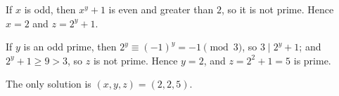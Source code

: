 If $x$ is odd, then $x^y+1$ is even and greater than $2$, so it is not prime. Hence $x=2$ and $z=2^y+1$.

If $y$ is an odd prime, then $2^y\equiv(-1)^y=-1\pmod3$, so $3\mid2^y+1$; and $2^y+1\ge9>3$, so $z$ is not prime. Hence $y=2$, and $z=2^2+1=5$ is prime.

The only solution is $\boxed{(x,y,z)=(2,2,5)}$.
